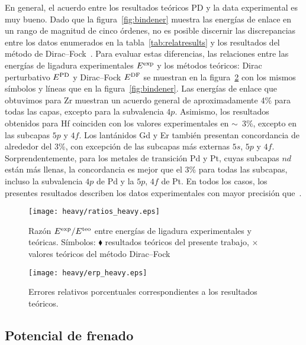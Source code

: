 En general, el acuerdo entre los resultados teóricos PD y la
data experimental es muy bueno. Dado que la figura~\ref{fig:bindener} 
muestra las energías de enlace en un rango de magnitud de cinco órdenes, 
no es posible discernir las discrepancias entre los datos enumerados 
en la tabla~\ref{tab:relatresults} y los resultados del método de 
Dirac--Fock~\cite{Desclaux:73}. Para evaluar estas diferencias, las 
relaciones entre las energías de ligadura experimentales 
$E^{\mbox{\scriptsize exp}}$ y los métodos teóricos: Dirac perturbativo 
$E^{\mbox{\scriptsize PD}}$ y Dirac--Fock $E^{\mbox{\scriptsize DF}}$ 
se muestran en la figura~\ref{fig:ratios} con los mismos símbolos y 
líneas que en la figura~\ref{fig:bindener}. Las energías de enlace que 
obtuvimos para Zr muestran un acuerdo general de aproximadamente 4\% 
para todas las capas, excepto para la subvalencia $4p$. Asimismo, los resultados obtenidos para Hf coinciden con los 
valores experimentales en $\sim$~3\%, excepto en las subcapas $5p$ y 
$4f$. Los lantánidos Gd y Er también presentan concordancia de alrededor 
del 3\%, con excepción de las subcapas más externas $5s$, $5p$ y $4f$. 
Sorprendentemente, para los metales de transición Pd y Pt, cuyas 
subcapas $nd$ están más llenas, la concordancia es mejor que el 3\% 
para todas las subcapas, incluso la subvalencia $4p$ de Pd y la $5p$, 
$4f$ de Pt. En todos los casos, los presentes resultados describen los 
datos experimentales con mayor precisión que~\cite{Desclaux:73}.

\begin{figure}[t]
\centering
\texttt{[image: heavy/ratios\_heavy.eps]} 
\caption{Razón $E^{\mbox{\scriptsize exp}}/E^{\mbox{\scriptsize teo}}$ 
entre energías de ligadura experimentales y teóricas. Símbolos: 
$\blacklozenge$ resultados teóricos del presente trabajo, 
$\times$ valores teóricos del método Dirac--Fock~\cite{Desclaux:73}}
\label{fig:ratios}
\end{figure}

\begin{figure}[t]
\centering
\texttt{[image: heavy/erp\_heavy.eps]} 
\caption{Errores relativos porcentuales correspondientes a los 
resultados teóricos.}
\label{fig:ratios}
\end{figure}

\subsection{Potencial de frenado}
\label{subsec:results-stopping}


